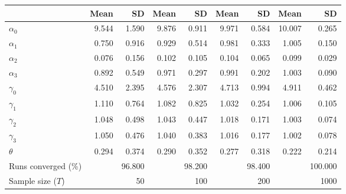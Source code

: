 
\begin{tabular}[t]{lrrrrrrrr}
\toprule
  & Mean & SD & Mean  & SD  & Mean   & SD   & Mean    & SD   \\
\midrule
$\alpha_{0}$ & 9.544 & 1.590 & 9.876 & 0.911 & 9.971 & 0.584 & 10.007 & 0.265\\
$\alpha_{1}$ & 0.750 & 0.916 & 0.929 & 0.514 & 0.981 & 0.333 & 1.005 & 0.150\\
$\alpha_{2}$ & 0.076 & 0.156 & 0.102 & 0.105 & 0.104 & 0.065 & 0.099 & 0.029\\
$\alpha_{3}$ & 0.892 & 0.549 & 0.971 & 0.297 & 0.991 & 0.202 & 1.003 & 0.090\\
$\gamma_{0}$ & 4.510 & 2.395 & 4.576 & 2.307 & 4.713 & 0.994 & 4.911 & 0.462\\
$\gamma_{1}$ & 1.110 & 0.764 & 1.082 & 0.825 & 1.032 & 0.254 & 1.006 & 0.105\\
$\gamma_{2}$ & 1.048 & 0.498 & 1.043 & 0.447 & 1.018 & 0.171 & 1.003 & 0.074\\
$\gamma_{3}$ & 1.050 & 0.476 & 1.040 & 0.383 & 1.016 & 0.177 & 1.002 & 0.078\\
$\theta$ & 0.294 & 0.374 & 0.290 & 0.352 & 0.277 & 0.318 & 0.222 & 0.214\\
Runs converged (\%) &  & 96.800 &  & 98.200 &  & 98.400 &  & 100.000\\
Sample size ($T$) &  & 50 &  & 100 &  & 200 &  & 1000\\
\bottomrule
\end{tabular}
